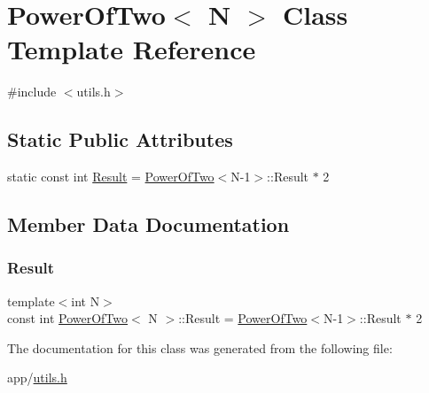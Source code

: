 \hypertarget{class_power_of_two}{}\section{Power\+Of\+Two$<$ N $>$ Class Template Reference}
\label{class_power_of_two}


{\ttfamily \#include $<$utils.\+h$>$}

\subsection*{Static Public Attributes}
\begin{DoxyCompactItemize}
\item 
static const int \hyperlink{class_power_of_two_a0bdb930d07970b60ed41542fc7ec0765}{Result} = \hyperlink{class_power_of_two}{Power\+Of\+Two}$<$N-\/1$>$\+::Result $\ast$ 2
\end{DoxyCompactItemize}


\subsection{Member Data Documentation}
\hypertarget{class_power_of_two_a0bdb930d07970b60ed41542fc7ec0765}{}\label{class_power_of_two_a0bdb930d07970b60ed41542fc7ec0765} 
\subsubsection{\texorpdfstring{Result}{Result}}
{\footnotesize\ttfamily template$<$int N$>$ \\
const int \hyperlink{class_power_of_two}{Power\+Of\+Two}$<$ N $>$\+::Result = \hyperlink{class_power_of_two}{Power\+Of\+Two}$<$N-\/1$>$\+::Result $\ast$ 2\hspace{0.3cm}{\ttfamily [static]}}



The documentation for this class was generated from the following file\+:\begin{DoxyCompactItemize}
\item 
app/\hyperlink{utils_8h}{utils.\+h}\end{DoxyCompactItemize}

